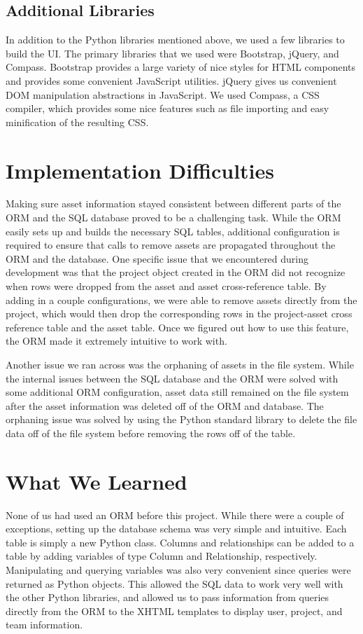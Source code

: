 \documentclass[12pt]{article}
\begin{document}
\subsection{Additional Libraries}
In addition to the Python libraries mentioned above, we used a few libraries to
build the UI. The primary libraries that we used were Bootstrap, jQuery, and
Compass. Bootstrap provides a large variety of nice styles for HTML components
and provides some convenient JavaScript utilities. jQuery gives us convenient
DOM manipulation abstractions in JavaScript. We used Compass, a CSS compiler,
which provides some nice features such as file importing and easy minification
of the resulting CSS.

\section{Implementation Difficulties}
Making sure asset information stayed consistent between different parts of the
ORM and the SQL database proved to be a challenging task. While the ORM easily
sets up and builds the necessary SQL tables, additional configuration is
required to ensure that calls to remove assets are propagated throughout the ORM
and the database. One specific issue that we encountered during development was
that the project object created in the ORM did not recognize when rows were
dropped from the asset and asset cross-reference table. By adding in a couple
configurations, we were able to remove assets directly from the project, which
would then drop the corresponding rows in the project-asset cross reference
table and the asset table. Once we figured out how to use this feature, the ORM
made it extremely intuitive to work with.

Another issue we ran across was the orphaning of assets in the file system.
While the internal issues between the SQL database and the ORM were solved with
some additional ORM configuration, asset data still remained on the file system
after the asset information was deleted off of the ORM and database. The
orphaning issue was solved by using the Python standard library to delete the
file data off of the file system before removing the rows off of the table.

\section{What We Learned}
None of us had used an ORM before this project. While there were a couple of
exceptions, setting up the database schema was very simple and intuitive. Each
table is simply a new Python class. Columns and relationships can be added to a
table by adding variables of type Column and Relationship, respectively.
Manipulating and querying variables was also very convenient since queries were
returned as Python objects. This allowed the SQL data to work very well with the
other Python libraries, and allowed us to pass information from queries directly
from the ORM to the XHTML templates to display user, project, and team
information.
\end{document}
